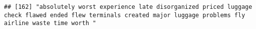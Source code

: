 \documentclass[
]{article}
\begin{document}
\begin{verbatim}
## [162] "absolutely worst experience late disorganized priced luggage check flawed ended flew terminals created major luggage problems fly airline waste time worth "                                                                                                                                                                                                                                                                                                                                                                                                                                                                                                                                                                                                                                                                                                                                                                                                                                                                                                                                                                                                                                                                                                                                                                                                                                                                                                                                                                                                                                                                                                                                                                                                                                   

\end{verbatim}
\end{document}
